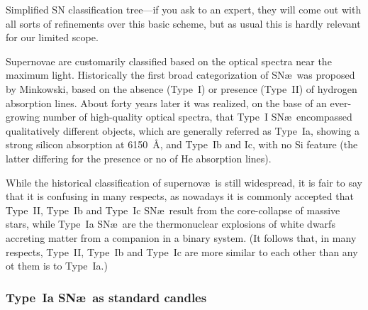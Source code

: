\begin{marginfigure}
  \begin{center}
  \end{center}
  \caption{Simplified SN classification tree---if you ask to an expert, they will
    come out with all sorts of refinements over this basic scheme, but as usual
    this is hardly relevant for our limited scope.}
\end{marginfigure}

Supernovae are customarily classified based on the optical spectra near the maximum
light. Historically the first broad categorization of SN\ae\ was proposed by
Minkowski, based on the absence (Type~I) or presence (Type~II) of hydrogen absorption
lines. About forty years later it was realized, on the base of an ever-growing number
of high-quality optical spectra, that Type~I SN\ae\ encompassed qualitatively
different objects, which are generally referred as Type~Ia, showing a strong
silicon absorption at 6150~\AA, and Type~Ib and Ic, with no Si feature (the
latter differing for the presence or no of He absorption lines).

While the historical classification of supernov\ae\ is still widespread, it is fair to
say that it is confusing in many respects, as nowadays it is commonly accepted that
Type~II, Type~Ib and Type~Ic SN\ae\ result from the core-collapse of massive stars,
while Type~Ia SN\ae\ are the thermonuclear explosions of white dwarfs accreting matter
from a companion in a binary system. (It follows that, in many respects, Type~II,
Type~Ib and Type~Ic are more similar to each other than any ot them is to Type~Ia.)


\subsubsection{Type~Ia SN\ae\ as standard candles}

